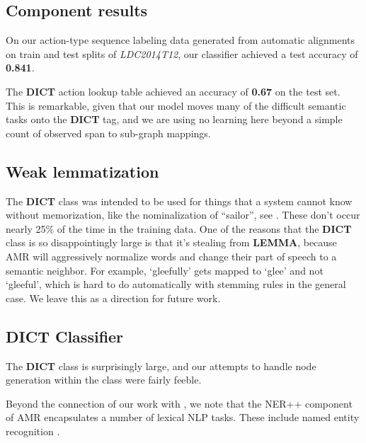 \documentclass[11pt]{article}
\begin{document}

\subsection{Component results}

On our action-type sequence labeling data generated from automatic alignments on train and test splits of \textit{LDC2014T12}, our classifier achieved a test accuracy of \textbf{0.841}.

The \textbf{DICT} action lookup table achieved an accuracy of \textbf{0.67} on the test set. This is remarkable, given that our model moves many of the difficult semantic tasks onto the \textbf{DICT} tag, and we are using no learning here beyond a simple count of observed span to sub-graph mappings.



\subsection{Weak lemmatization}

The \textbf{DICT} class was intended to be used for things that a system cannot know without memorization, like the nominalization of ``sailor'', see . These don't occur nearly 25\% of the time in the training data. One of the reasons that the \textbf{DICT} class is so disappointingly large is that it's stealing from \textbf{LEMMA}, because AMR will aggressively normalize words and change their part of speech to a semantic neighbor. For example, `gleefully' gets mapped to `glee' and not `gleeful', which is hard to do automatically with stemming rules in the general case. We leave this as a direction for future work.

\subsection{DICT Classifier}

The \textbf{DICT} class is surprisingly large, and our attempts to handle node generation within the class were fairly feeble.


Beyond the connection of our work with , we note that 
the NER++ component of AMR encapsulates a number of lexical NLP tasks.
These include named entity recognition \cite{2007nadeau-ner,stanford-ner}.
\end{document}
